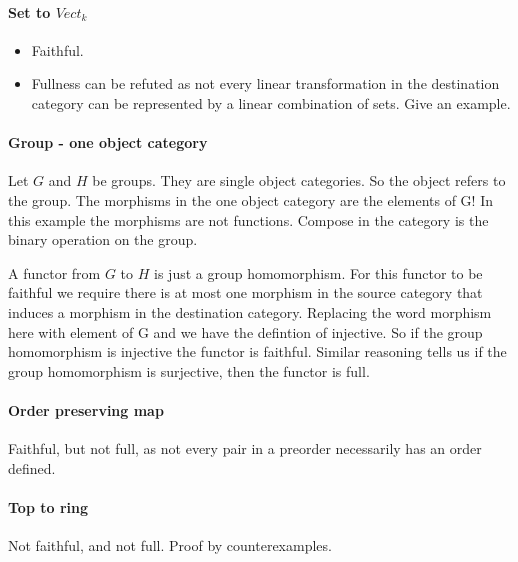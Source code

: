 \documentclass{article}
\begin{document}
\paragraph{Set to $Vect_k$}

\begin{itemize}

\item Faithful.

\item Fullness can be refuted as not every linear transformation in the destination category can be represented by a linear combination of sets. Give an example.

\end{itemize}

\paragraph{Group - one object category}

Let $G$ and $H$ be groups. They are single object categories. So the object refers to the group. The morphisms in the one object category are the elements of G! In this example the morphisms are not functions. Compose in the category is the binary operation on the group.

A functor from $G$ to $H$ is just a group homomorphism. For this functor to be faithful we require there is at most one morphism in the source category that induces a morphism in the destination category. Replacing the word morphism here with element of G and we have the defintion of injective. So if the group homomorphism is injective the functor is faithful. Similar reasoning tells us if the group homomorphism is surjective, then the functor is full.

\paragraph{Order preserving map}

Faithful, but not full, as not every pair in a preorder necessarily has an order defined.

\paragraph{Top to ring}

Not faithful, and not full. Proof by counterexamples.
\end{document}
